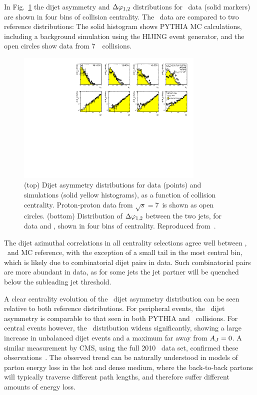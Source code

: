 In Fig.~\ref{fig:GR:final_4x2} the dijet asymmetry and $\Delta\varphi_{1,2}$ distributions 
for \PbPb\ data (solid markers) are shown in four bins of collision centrality. 
The \PbPb\ data are compared to two reference distributions: The solid histogram shows 
PYTHIA MC calculations, including a background simulation using the HIJING event generator,
and the open circles show data from 7\TeV\ \pp\ collisions. 
\begin{figure}[!thb]
\begin{center}
\includegraphics[width=0.8\textwidth]{jetfigures/final_4x2_23_newpp.pdf}
\caption{
(top) Dijet asymmetry distributions for data (points) and {} 
simulations (solid yellow histograms), as a function of collision centrality.  
Proton-proton data from $\sqrt{s}=7$\TeV\ is shown as open circles.
(bottom) Distribution of $\Delta\varphi_{1,2}$ between the two jets, 
for data and {}, shown in four bins of centrality.
Reproduced from~\cite{Aad:2010bu}.}
\label{fig:GR:final_4x2}
\end{center}
\end{figure}

The dijet azimuthal correlations in all centrality selections agree well between \PbPb, 
\pp\ and MC reference, with the exception of a small tail in the most central bin, 
which is likely due to combinatorial dijet pairs in data. Such combinatorial pairs
are more abundant in data, as for some jets the jet partner will be quenched 
below the subleading jet threshold.

A clear centrality evolution of the \PbPb\ dijet asymmetry distribution can be seen relative
to both reference distributions.  For peripheral events, the \PbPb\ dijet asymmetry
is comparable to that seen in both PYTHIA and \pp\ collisions. For central events however,
the \AJ\ distribution widens significantly, showing a large increase in unbalanced
dijet events and a maximum far away from $A_J =  0$. 
A similar measurement by CMS, using the full 2010 \PbPb\ data set, confirmed these 
observations~\cite{Chatrchyan:2011sx}.
The observed trend can be naturally understood in models of parton energy
loss in the hot and dense medium, where the back-to-back partons will typically traverse
different path lengths, and therefore suffer different amounts of energy loss. 

